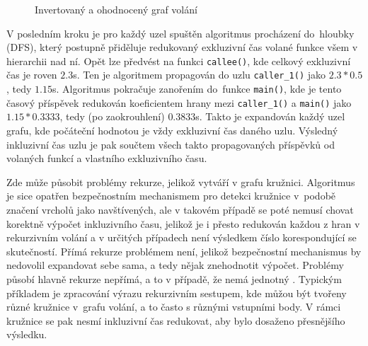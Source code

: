 \documentclass[czech,BP]{thesiskiv}
\begin{document}
\begin{figure}[htp] 
\caption{Invertovaný a ohodnocený graf volání}\label{obr:callgraph_ex_rev}
\end{figure}

V posledním kroku je pro každý uzel spuštěn algoritmus procházení do~hloubky (DFS), který postupně přiděluje redukovaný exkluzivní čas volané funkce všem v hierarchii nad ní. Opět lze předvést na funkci \texttt{callee()}, kde celkový exkluzivní čas je roven $2.3$s. Ten je algoritmem propagován do uzlu \texttt{caller\_1()} jako $2.3*0.5$, tedy $1.15$s. Algoritmus pokračuje zanořením do~funkce \texttt{main()}, kde je tento časový příspěvek redukován koeficientem hrany mezi \texttt{caller\_1()} a \texttt{main()} jako $1.15*0.3333$, tedy (po zaokrouhlení) $0.3833$s. Takto je expandován každý uzel grafu, kde počáteční hodnotou je vždy exkluzivní čas daného uzlu. Výsledný inkluzivní čas uzlu je pak součtem všech takto propagovaných příspěvků od volaných funkcí a vlastního exkluzivního času.

Zde může působit problémy rekurze, jelikož vytváří v grafu kružnici. Algoritmus je sice opatřen bezpečnostním mechanismem pro detekci kružnice v~podobě značení vrcholů jako navštívených, ale v takovém případě se poté nemusí chovat korektně výpočet inkluzivního času, jelikož je i přesto redukován každou z hran v rekurzivním volání a v určitých případech není výsledkem číslo korespondující se skutečností. Přímá rekurze problémem není, jelikož bezpečnostní mechanismus by nedovolil expandovat sebe sama, a tedy nějak znehodnotit výpočet. Problémy působí hlavně rekurze nepřímá, a to v případě, že nemá jednotný . Typickým příkladem je zpracování výrazu rekurzivním sestupem, kde můžou být tvořeny různé kružnice v~grafu volání, a to často s různými vstupními body. V rámci kružnice se pak nesmí inkluzivní čas redukovat, aby bylo dosaženo přesnějšího výsledku.
\end{document}
